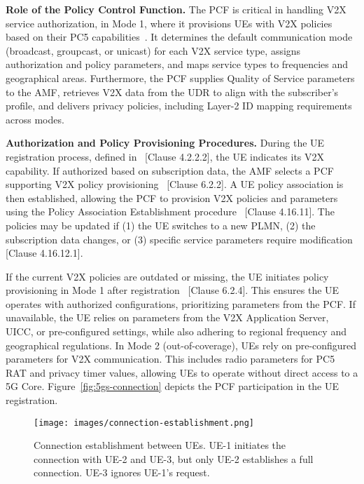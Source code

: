 \textbf{Role of the Policy Control Function.} The PCF is critical in handling V2X service authorization, in Mode 1, where it provisions UEs with V2X policies based on their PC5 capabilities~\cite{3gpp.23.287}. It determines the default communication mode (broadcast, groupcast, or unicast) for each V2X service type, assigns authorization and policy parameters, and maps service types to frequencies and geographical areas. Furthermore, the PCF supplies Quality of Service parameters to the AMF, retrieves V2X data from the UDR to align with the subscriber’s profile, and delivers privacy policies, including Layer-2 ID mapping requirements across modes.

\textbf{Authorization and Policy Provisioning Procedures.} During the UE registration process, defined in~\cite{3gpp.23.502} [Clause 4.2.2.2], the UE indicates its V2X capability. If authorized based on subscription data, the AMF selects a PCF supporting V2X policy provisioning~\cite{3gpp.23.287} [Clause 6.2.2]. A UE policy association is then established, allowing the PCF to provision V2X policies and parameters using the Policy Association Establishment procedure~\cite{3gpp.23.502} [Clause 4.16.11]. The policies may be updated if (1) the UE switches to a new PLMN, (2) the subscription data changes, or (3) specific service parameters require modification~\cite{3gpp.23.502} [Clause 4.16.12.1].

If the current V2X policies are outdated or missing, the UE initiates policy provisioning in Mode 1 after registration~\cite{3gpp.23.287} [Clause 6.2.4]. This ensures the UE operates with authorized configurations, prioritizing parameters from the PCF. If unavailable, the UE relies on parameters from the V2X Application Server, UICC, or pre-configured settings, while also adhering to regional frequency and geographical regulations. In Mode 2 (out-of-coverage), UEs rely on pre-configured parameters for V2X communication. This includes radio parameters for PC5 RAT and privacy timer values, allowing UEs to operate without direct access to a 5G Core. Figure~\ref{fig:5gs-connection} depicts the PCF participation in the UE registration.

\begin{figure}[!t]
     \centering
     \texttt{[image: images/connection-establishment.png]}
     \caption{Connection establishment between UEs. UE-1 initiates the connection with UE-2 and UE-3, but only UE-2 establishes a full connection. UE-3 ignores UE-1's request.}
     \label{fig:connection}
\end{figure}


